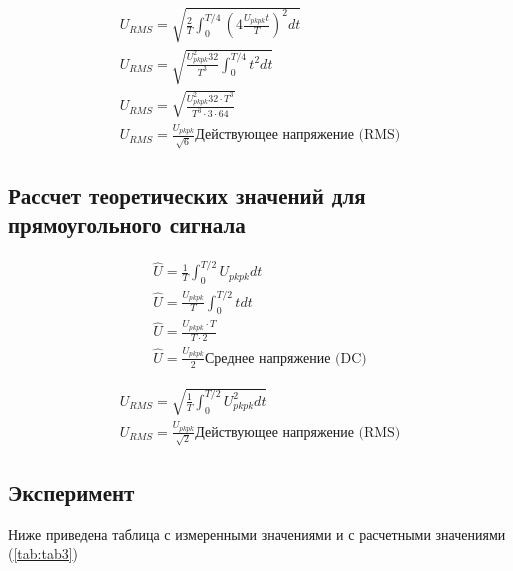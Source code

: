 \documentclass[a4paper,14pt]{article}
\begin{document}
\begin{equation}
\begin{aligned}
U_{RMS}  =  \sqrt{\frac{2}{T}\int_{0}^{T/4}{(4\frac{U_{pkpk} t  }{T})^2} dt}\\
U_{RMS}  =  \sqrt{\frac{U_{pkpk}^2 32}{T^3}\int_{0}^{T/4}{t^2}dt}\\
U_{RMS}  =  \sqrt{\frac{U_{pkpk}^2 32 \cdot T^3}{T^3 \cdot 3 \cdot 64}}\\
U_{RMS}  =  \frac{U_{pkpk}}{\sqrt{6}} \text{Действующее напряжение (RMS)}
 \label{eq:exp2}
 \end{aligned}
\end{equation}



\subsection{Рассчет теоретических значений для прямоугольного сигнала}

\begin{equation}
\begin{aligned}
\hat{U}  = \frac{1}{T}\int_{0}^{T/2}{U_{pkpk} dt }\\
\hat{U}  = \frac{U_{pkpk}}{T}\int_{0}^{T/2}{ t dt}\\
\hat{U}  = \frac{U_{pkpk}\cdot T}{T\cdot 2}\\
\hat{U} = \frac{U_{pkpk}}{2} \text{Среднее напряжение (DC)}
\label{eq:exp3}
 \end{aligned}
\end{equation}


\begin{equation}
\begin{aligned}
U_{RMS}  =  \sqrt{ \frac{1}{T}\int_{0}^{T/2}{U_{pkpk}^2 dt }}\\
U_{RMS}  =  \frac{U_{pkpk}}{\sqrt{2}} \text{Действующее напряжение (RMS)}
 \label{eq:exp4}
 \end{aligned}
\end{equation}

\subsection{Эксперимент}

Ниже приведена таблица с измеренными значениями и с расчетными значениями (\autoref{tab:tab3})
\end{document}
